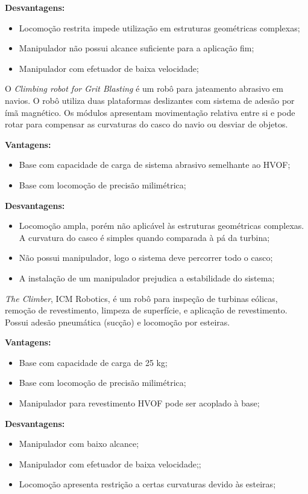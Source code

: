 \textbf{Desvantagens:}
\begin{itemize}
  \item Locomoção restrita impede utilização em estruturas geométricas
  complexas;
  \item Manipulador não possui alcance suficiente para a aplicação fim;
  \item Manipulador com efetuador de baixa velocidade;
\end{itemize}

O \emph{Climbing robot for Grit Blasting} é um robô para jateamento abrasivo em
navios. O robô utiliza duas plataformas deslizantes com sistema de adesão por
ímã magnético. Os módulos apresentam movimentação relativa entre si e pode rotar
para compensar as curvaturas do casco do navio ou desviar de objetos. 

\textbf{Vantagens:}
\begin{itemize}
  \item Base com capacidade de carga de sistema abrasivo semelhante ao HVOF;
  \item Base com locomoção de precisão milimétrica;
\end{itemize}

\textbf{Desvantagens:}
\begin{itemize}
  \item Locomoção ampla, porém não aplicável às estruturas geométricas
  complexas. A curvatura do casco é simples quando comparada à pá da turbina;
  \item Não possui manipulador, logo o sistema deve percorrer todo o
  casco;
  \item A instalação de um manipulador prejudica a estabilidade do sistema;
\end{itemize}

\emph{The Climber}, ICM Robotics, é um robô para inspeção de turbinas eólicas,
remoção de revestimento, limpeza de superfície, e aplicação de revestimento.
Possui adesão pneumática (sucção) e locomoção por esteiras. 

\textbf{Vantagens:}
\begin{itemize}
  \item Base com capacidade de carga de 25 kg;
  \item Base com locomoção de precisão milimétrica;
  \item Manipulador para revestimento HVOF pode ser acoplado à base; 
\end{itemize}

\textbf{Desvantagens:}
\begin{itemize}
  \item Manipulador com baixo alcance;
  \item Manipulador com efetuador de baixa velocidade;;
  \item Locomoção apresenta restrição a certas curvaturas devido às esteiras;
\end{itemize}


